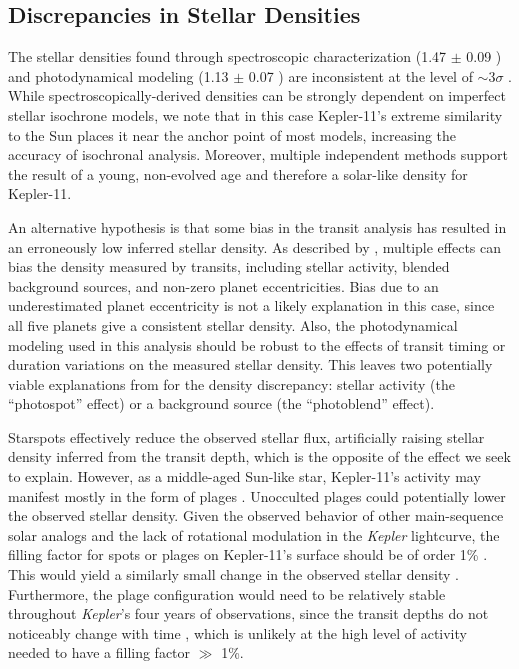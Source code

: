 \documentclass[oneside]{emulateapj}
\begin{document}
\subsection{Discrepancies in Stellar Densities}

The stellar densities found through spectroscopic characterization (1.47 $\pm$ 0.09 \gcm) and photodynamical modeling (1.13 $\pm$ 0.07 \gcm) are inconsistent at the level of $\sim$3$\sigma$ . While spectroscopically-derived densities can be strongly dependent on imperfect stellar isochrone models, we note that in this case Kepler-11's extreme similarity to the Sun places it near the anchor point of most models, increasing the accuracy of isochronal analysis. Moreover, multiple independent methods support the result of a young, non-evolved age and therefore a solar-like density for Kepler-11.

An alternative hypothesis is that some bias in the transit analysis has resulted in an erroneously low inferred stellar density. As described by \citet{Kipping2014}, multiple effects can bias the density measured by transits, including stellar activity, blended background sources, and non-zero planet eccentricities. Bias due to an underestimated planet eccentricity is not a likely explanation in this case, since all five planets give a consistent stellar density. Also, the photodynamical modeling used in this analysis should be robust to the effects of transit timing or duration variations on the measured stellar density. This leaves two potentially viable explanations from \citet{Kipping2014} for the density discrepancy: stellar activity (the ``photospot'' effect) or a background source (the ``photoblend'' effect).

Starspots effectively reduce the observed stellar flux, artificially raising stellar density inferred from the transit depth, which is the opposite of the effect we seek to explain. However, as a middle-aged Sun-like star, Kepler-11's activity may manifest mostly in the form of plages . Unocculted plages could potentially lower the observed stellar density. Given the observed behavior of other main-sequence solar analogs and the lack of rotational modulation in the \textit{Kepler} lightcurve, the filling factor for spots or plages on Kepler-11's surface should be of order 1\% . This would yield a similarly small change in the observed stellar density \citep[O($10^{-2}$),][]{Kipping2014}. Furthermore, the plage configuration would need to be relatively stable throughout \textit{Kepler}'s four years of observations, since the transit depths do not noticeably change with time , which is unlikely at the high level of activity needed to have a filling factor $\gg$ 1\%.
\end{document}
